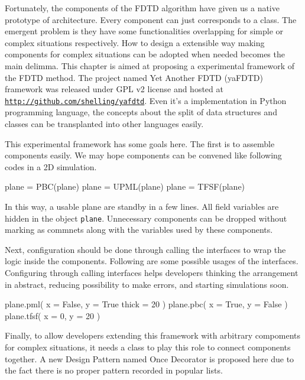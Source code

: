 Fortunately, the components of the FDTD algorithm have given us a native prototype of architecture. Every component can
just corresponds to a class. The emergent problem is they have some functionalities overlapping for simple or complex
situations respectively. How to design a extensible way making components for complex situations can be adopted when
needed becomes the main delimma. This chapter is aimed at proposing a experimental framework of the FDTD method. The
project named Yet Another FDTD (yaFDTD) framework was released under GPL v2 license and hosted at
\texttt{\url{http://github.com/shelling/yafdtd}}. Even it's a implementation in Python programming language, the
concepts about the split of data structures and classes can be transplanted into other languages easily.

This experimental framework has some goals here. The first is to assemble components easily. We may hope components can
be convened like following codes in a 2D simulation.
\begin{code}
  plane = PBC(plane)
  plane = UPML(plane)
  plane = TFSF(plane)
\end{code}
In this way, a usable plane are standby in a few lines. All field variables are hidden in the object
\texttt{plane}. Unnecessary components can be dropped without marking as commnets along with the variables used by these
components.

Next, configuration should be done through calling the interfaces to wrap the logic inside the components. Following are
some possible usages of the interfaces. Configuring through calling interfaces helps developers thinking the arrangement
in abstract, reducing possibility to make errors, and starting simulations soon.
\begin{code}
  plane.pml(
    x = False,
    y = True
    thick = 20
  )
  plane.pbc(
    x = True,
    y = False
  )
  plane.tfsf(
    x = 0,
    y = 20
  )
\end{code}
Finally, to allow developers extending this framework with arbitrary compoments for complex situations, it needs a class
to play this role to connect components together. A new Design Pattern named Once Decorator is proposed here due to the
fact there is no proper pattern recorded in popular lists.
